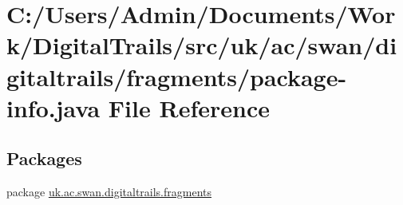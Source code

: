 \hypertarget{fragments_2package-info_8java}{\section{C\+:/\+Users/\+Admin/\+Documents/\+Work/\+Digital\+Trails/src/uk/ac/swan/digitaltrails/fragments/package-\/info.java File Reference}
\label{fragments_2package-info_8java}
}
\subsection*{Packages}
\begin{DoxyCompactItemize}
\item 
package \hyperlink{namespaceuk_1_1ac_1_1swan_1_1digitaltrails_1_1fragments}{uk.\+ac.\+swan.\+digitaltrails.\+fragments}
\end{DoxyCompactItemize}
